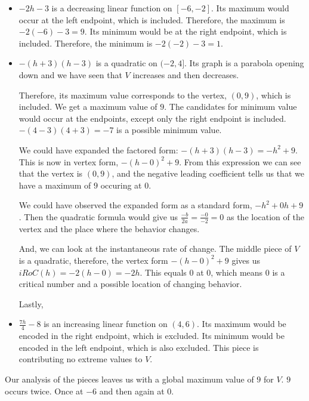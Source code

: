 \documentclass{ximera}
\begin{document}
\begin{itemize}
  \item \textbf{$-2h-3$} is a decreasing linear function on $[-6, -2]$.  Its maximum would occur at the left endpoint, which is included. Therefore, the maximum is $-2(-6)-3 = 9$. Its minimum would be at the right endpoint, which is included. Therefore, the minimum is $-2(-2)-3 = 1$.

  \item \textbf{$-(h+3)(h-3)$} is a quadratic on $(-2, 4]$.  Its graph is a parabola opening down and we have seen that $V$ increases and then decreases.  

  Therefore, its maximum value corresponds to the vertex, $(0, 9)$, which is included.  We get a maximum value of $9$.  The candidates for minimum value would occur at the endpoints, except only the right endpoint is included.  $-(4-3)(4+3) = -7$ is a possible minimum value.


\begin{observation}


We could have expanded the factored form: $-(h+3)(h-3) = -h^2 + 9$.  This is now in vertex form, $-(h-0)^2 + 9$. From this expression we can see that the vertex is $(0, 9)$, and the negative leading coefficient tells us that we have a maximum of $9$ occuring at $0$.


We could have observed the expanded form as a standard form, $-h^2 + 0 h + 9$.  Then the quadratic formula would give us $\frac{-b}{2a} = \frac{-0}{-2} = 0$ as the location of the vertex and the place where the behavior changes.


And, we can look at the instantaneous rate of change. The middle piece of $V$ is a quadratic, therefore, the vertex form $-(h-0)^2 + 9$ gives us $iRoC(h) = -2(h-0) = -2h$.  This equals $0$ at $0$, which means $0$ is a critical number and a possible location of changing behavior.

\end{observation}
Lastly, \\


  \item \textbf{$\frac{7h}{4} - 8$} is an increasing linear function on $(4, 6)$.  Its maximum would be encoded in the right endpoint, which is excluded. Its minimum would be encoded in the left endpoint, which is also excluded. This piece is contributing no extreme values to $V$.
\end{itemize}


Our analysis of the pieces leaves us with a global maximum value of $9$ for $V$.  $9$ occurs twice.  Once at $-6$ and then again at $0$.
\end{document}
